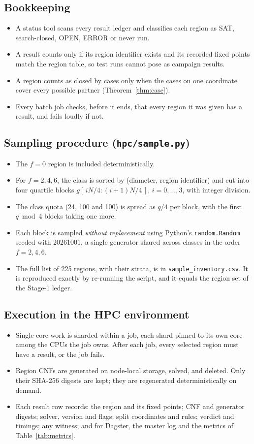 \documentclass[11pt,a4paper]{article}
\theoremstyle{definition}
\newcommand{\code}[1]{\texttt{#1}}
\newcommand{\st}[1]{\textsf{#1}}
\begin{document}
\subsection{Bookkeeping}
\begin{itemize}
\item A status tool scans every result ledger and classifies each region as \st{SAT},
\st{search-closed}, \st{OPEN}, \st{ERROR} or never run.
\item A result counts only if its region identifier exists and its recorded fixed points match
the region table, so test runs cannot pose as campaign results.
\item A region counts as closed by cases only when the cases on one coordinate cover every
possible partner (Theorem~\ref{thm:case}).
\item Every batch job checks, before it ends, that every region it was given has a result, and
fails loudly if not.
\end{itemize}
\subsection{Sampling procedure (\code{hpc/sample.py})}
\begin{itemize}
\item The $f=0$ region is included deterministically.
\item For $f=2,4,6$, the class is sorted by (diameter, region identifier) and cut into four
quartile blocks $g[\,iN/4 : (i+1)N/4\,]$, $i=0,\dots,3$, with integer division.
\item The class quota (24, 100 and 100) is spread as $q/4$ per block, with the first $q\bmod 4$
blocks taking one more.
\item Each block is sampled \emph{without replacement} using Python's \code{random.Random}
seeded with 20261001, a single generator shared across classes in the order $f=2,4,6$.
\item The full list of 225 regions, with their strata, is in
\code{sample\_inventory.csv}. It is
reproduced exactly by re-running the script, and it equals the region set of the Stage-1
ledger.
\end{itemize}
\subsection{Execution in the HPC environment}
\begin{itemize}
\item Single-core work is sharded within a job, each shard pinned to its own core among the
CPUs the job owns. After each job, every selected region must have a result, or the job fails.
\item Region CNFs are generated on node-local storage, solved, and deleted. Only their SHA-256
digests are kept; they are regenerated deterministically on demand.
\item Each result row records: the region and its fixed points; CNF and generator digests;
solver, version and flags; split coordinates and rules; verdict and timings; any witness; and
for Dagster, the master log and the metrics of Table~\ref{tab:metrics}.
\end{itemize}
\end{document}
